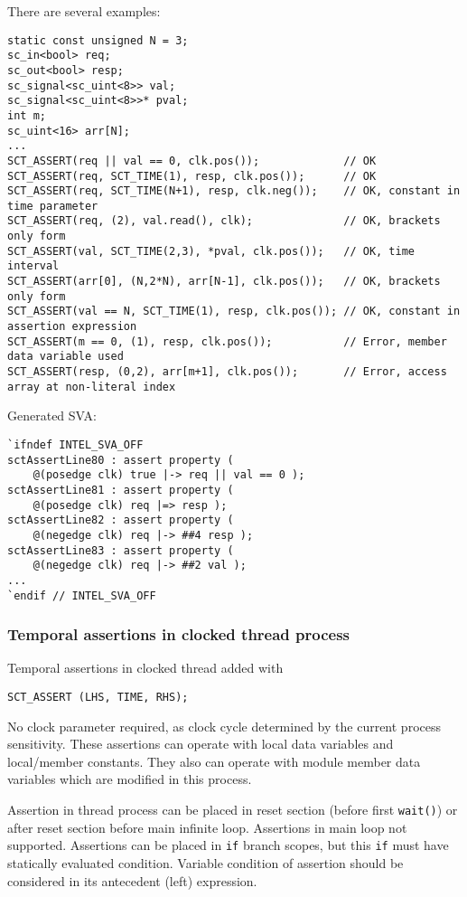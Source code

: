 There are several examples:
\begin{lstlisting}[style=mycpp]
static const unsigned N = 3;
sc_in<bool> req;
sc_out<bool> resp;
sc_signal<sc_uint<8>> val;
sc_signal<sc_uint<8>>* pval;
int m;
sc_uint<16> arr[N];
...
SCT_ASSERT(req || val == 0, clk.pos());             // OK
SCT_ASSERT(req, SCT_TIME(1), resp, clk.pos());      // OK
SCT_ASSERT(req, SCT_TIME(N+1), resp, clk.neg());    // OK, constant in time parameter
SCT_ASSERT(req, (2), val.read(), clk);              // OK, brackets only form
SCT_ASSERT(val, SCT_TIME(2,3), *pval, clk.pos());   // OK, time interval
SCT_ASSERT(arr[0], (N,2*N), arr[N-1], clk.pos());   // OK, brackets only form
SCT_ASSERT(val == N, SCT_TIME(1), resp, clk.pos()); // OK, constant in assertion expression 
SCT_ASSERT(m == 0, (1), resp, clk.pos());           // Error, member data variable used
SCT_ASSERT(resp, (0,2), arr[m+1], clk.pos());       // Error, access array at non-literal index
\end{lstlisting}
%
Generated SVA:
\begin{lstlisting}[style=myverilog]
`ifndef INTEL_SVA_OFF
sctAssertLine80 : assert property (
    @(posedge clk) true |-> req || val == 0 );
sctAssertLine81 : assert property (
    @(posedge clk) req |=> resp );
sctAssertLine82 : assert property (
    @(negedge clk) req |-> ##4 resp );
sctAssertLine83 : assert property (
    @(negedge clk) req |-> ##2 val );
...
`endif // INTEL_SVA_OFF
\end{lstlisting}

\subsubsection{Temporal assertions in clocked thread process}

Temporal assertions in clocked thread added with 
\begin{lstlisting}[style=mycpp]
SCT_ASSERT (LHS, TIME, RHS);
\end{lstlisting}
%
No clock parameter required, as clock cycle determined by the current process sensitivity.
These assertions can operate with local data variables and local/member constants. They also can operate with module member data variables which are modified in this process.

Assertion in thread process can be placed in reset section (before first {\tt wait()}) or after reset section before main infinite loop. Assertions in main loop not supported. Assertions can be placed in {\tt if} branch scopes, but this {\tt if} must have statically evaluated condition. Variable condition of assertion should be considered in its antecedent (left) expression. 

